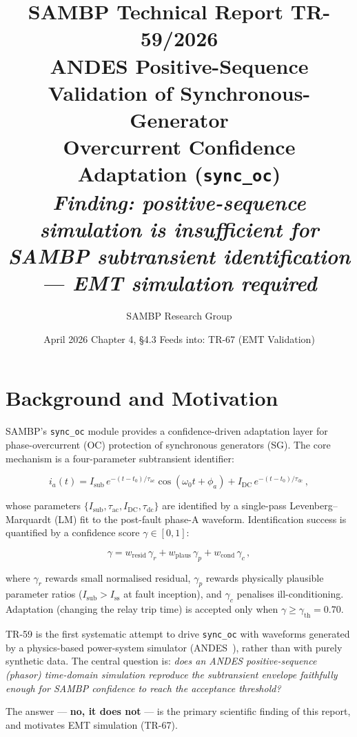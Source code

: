 \documentclass[11pt,a4paper]{article}
\title{%
  \textbf{\textsf{\color{sambpblue}SAMBP Technical Report TR-59/2026}}\\[6pt]
  \Large ANDES Positive-Sequence Validation of Synchronous-Generator\\
  Overcurrent Confidence Adaptation (\texttt{sync\_oc})\\[4pt]
  \large \textit{Finding: positive-sequence simulation is insufficient for\\
  SAMBP subtransient identification — EMT simulation required}%
}
\author{SAMBP Research Group}
\date{April 2026 \quad\textbar\quad Chapter 4, \S4.3 \quad\textbar\quad
      Feeds into: TR-67 (EMT Validation)}
\newcommand{\Isub}{I_{\text{sub}}}
\newcommand{\Iss}{I_{\text{ss}}}
\newcommand{\tauac}{\tau_{\text{ac}}}
\newcommand{\taudc}{\tau_{\text{dc}}}
\newcommand{\gconf}{\gamma}
\newcommand{\gth}{\gamma_{\text{th}}}
\begin{document}
\maketitle
\thispagestyle{empty}
\tableofcontents
\clearpage

\section{Background and Motivation}
\label{sec:background}

SAMBP's \texttt{sync\_oc} module provides a confidence-driven adaptation layer
for phase-overcurrent (OC) protection of synchronous generators (SG).  The
core mechanism is a four-parameter subtransient identifier:

\begin{equation}
  i_a(t) = \Isub\,e^{-(t-t_0)/\tauac}\cos(\omega_0 t + \phi_a)
           + I_{\text{DC}}\,e^{-(t-t_0)/\taudc}\,,
  \label{eq:sg_model}
\end{equation}

\noindent whose parameters $\{\Isub, \tauac, I_{\text{DC}}, \taudc\}$ are
identified by a single-pass Levenberg--Marquardt (LM) fit to the post-fault
phase-A waveform.  Identification success is quantified by a confidence
score $\gconf \in [0, 1]$:

\begin{equation}
  \gconf = w_{\text{resid}}\,\gconf_r
         + w_{\text{plaus}}\,\gconf_p
         + w_{\text{cond}}\,\gconf_c\,,
  \label{eq:gamma}
\end{equation}

\noindent where $\gconf_r$ rewards small normalised residual, $\gconf_p$
rewards physically plausible parameter ratios ($\Isub > \Iss$ at fault
inception), and $\gconf_c$ penalises ill-conditioning.  Adaptation (changing
the relay trip time) is accepted only when $\gconf \geq \gth = 0.70$.

TR-59 is the first systematic attempt to drive \texttt{sync\_oc} with
waveforms generated by a physics-based power-system simulator (ANDES~\cite{andes}),
rather than with purely synthetic data.  The central question is: \emph{does
an ANDES positive-sequence (phasor) time-domain simulation reproduce the
subtransient envelope faithfully enough for SAMBP confidence to reach the
acceptance threshold?}

The answer — \textbf{no, it does not} — is the primary scientific finding
of this report, and motivates EMT simulation (TR-67).
\end{document}

